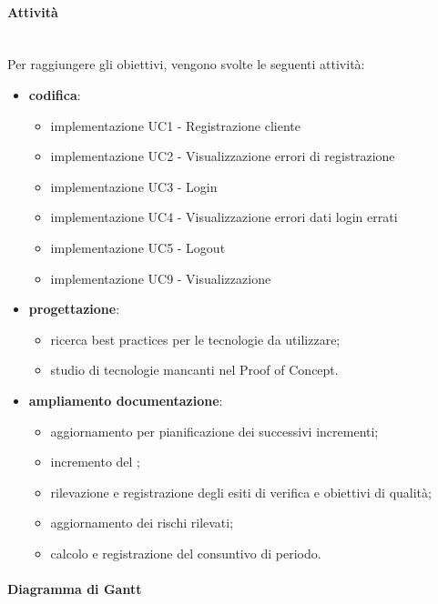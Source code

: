 \paragraph{Attività}\\
Per raggiungere gli obiettivi, vengono svolte le seguenti attività:
\begin{itemize}

\item \textbf{codifica}:
\begin{itemize}
\item implementazione UC1 - Registrazione cliente
\item implementazione UC2 - Visualizzazione errori di registrazione
\item implementazione UC3 - Login
\item implementazione UC4 - Visualizzazione errori dati login errati
\item implementazione UC5 - Logout
\item implementazione UC9 - Visualizzazione 
\end{itemize}

\item \textbf{progettazione}:
\begin{itemize}
\item ricerca best practices per le tecnologie da utilizzare;
\item studio di tecnologie mancanti nel Proof of Concept.
\end{itemize}

\item \textbf{ampliamento documentazione}:
\begin{itemize}
\item aggiornamento  per pianificazione dei successivi incrementi;
\item incremento del ;
\item rilevazione e registrazione degli esiti di verifica e obiettivi di qualità;
\item aggiornamento dei rischi rilevati;
\item calcolo e registrazione del consuntivo di periodo.
\end{itemize}

\end{itemize}
\paragraph{Diagramma di Gantt}\\